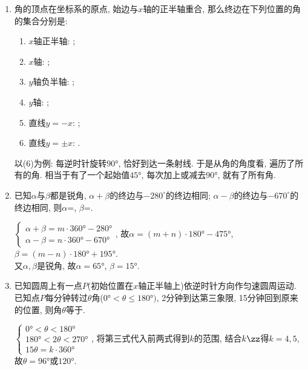 \begin{enumerate}
\item 角的顶点在坐标系的原点, 始边与$x$轴的正半轴重合, 那么终边在下列位置的角的集合分别是: 
\begin{enumerate}[(1)]
\item $x$轴正半轴: ; 
\item $x$轴: ; 
\item $y$轴负半轴: ; 
\item $y$轴: ; 
\item 直线$y=-x$: ; 
\item 直线$y=\pm{x}$: . 
\end{enumerate}
\begin{jieda}
以(6)为例: 每逆时针旋转$\ang{90}$, 恰好到达一条射线. 于是从角的角度看, 遍历了所有的角. 
相当于有了一个起始值$\ang{45}$, 每次加上或减去$\ang{90}$, 就有了所有角. 
\end{jieda}


\item 已知$\alpha$与$\beta$都是锐角, $\alpha+\beta$的终边与$-280^{\circ}$的终边相同; 
$\alpha-\beta$的终边与$-670^{\circ}$的终边相同, 则$\alpha$=, $\beta$=. 
\begin{jieda}
$\begin{cases}
\alpha+\beta=m\cdot\ang{360}-\ang{280}\\
\alpha-\beta=n\cdot\ang{360}-\ang{670}
\end{cases}$, 
故$\alpha=(m+n)\cdot\ang{180}-\ang{475}$, $\beta=(m-n)\cdot\ang{180}+\ang{195}$. \\
又$\alpha,\beta$是锐角, 故$\alpha=\ang{65}$, $\beta=\ang{15}$. 
\end{jieda}


\item 已知圆周上有一点$P$(初始位置在$x$轴正半轴上)依逆时针方向作匀速圆周运动. 已知点$P$每分钟转过$\theta$角($\ang{0}<\theta\leq\ang{180})$, 
2分钟到达第三象限, 15分钟回到原来的位置, 则角$\theta$等于. 
\begin{jieda}
$\begin{cases}
\ang{0}<\theta<\ang{180}\\
\ang{180}<2\theta<\ang{270}\\
15\theta=k\cdot\ang{360}
\end{cases}$, 
将第三式代入前两式得到$k$的范围, 结合$k\zz$得$k=4,5$, 故$\theta=\ang{96}$或$\ang{120}$. 
\end{jieda}



\end{enumerate}
